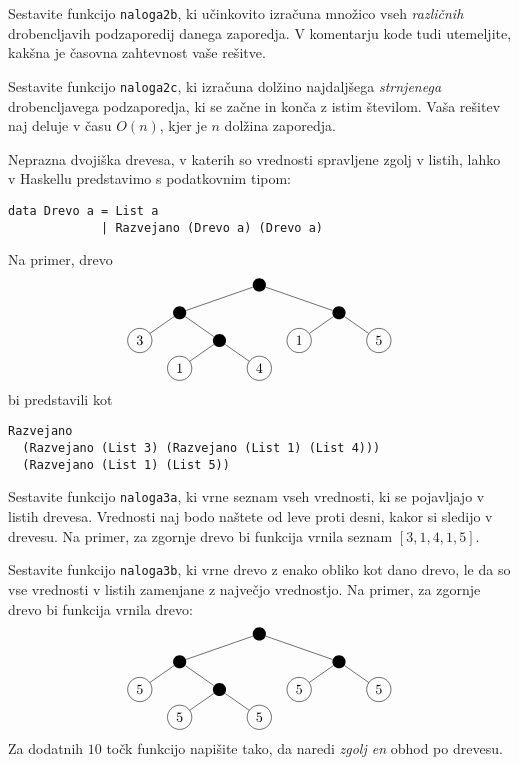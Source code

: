 \documentclass[arhiv]{../izpit}
\begin{document}
\podnaloga[10 točk]
  Sestavite funkcijo \texttt{naloga2b}, ki učinkovito izračuna množico vseh \emph{različnih} drobencljavih podzaporedij danega zaporedja. V komentarju kode tudi utemeljite, kakšna je časovna zahtevnost vaše rešitve.

\podnaloga[+10 točk]
  Sestavite funkcijo \texttt{naloga2c}, ki izračuna dolžino najdaljšega \emph{strnjenega} drobencljavega podzaporedja, ki se začne in konča z istim številom. Vaša rešitev naj deluje v času $O(n)$, kjer je $n$ dolžina zaporedja.



Neprazna dvojiška drevesa, v katerih so vrednosti spravljene zgolj v listih, lahko v Haskellu predstavimo s podatkovnim tipom:
\begin{verbatim}
data Drevo a = List a
             | Razvejano (Drevo a) (Drevo a)
\end{verbatim}
Na primer, drevo
\[
  \begin{tikzpicture}[level distance=0.7cm,
    level 1/.style={sibling distance=4cm},
    level 2/.style={sibling distance=2cm},
    level 3/.style={sibling distance=2cm}
    ]
    \node[circle, fill] (d) {}
      child {node[circle, fill] {}
        child {node[circle, draw] {3}}
        child {node[circle, fill] {}
          child {node[circle, draw] {1}}
          child {node[circle, draw] {4}}
        }
      }
      child {node[circle, fill] {}
        child {node[circle, draw] {1}}
        child {node[circle, draw] {5}}
      };
  \end{tikzpicture}
\]
bi predstavili kot
\begin{verbatim}
Razvejano
  (Razvejano (List 3) (Razvejano (List 1) (List 4)))
  (Razvejano (List 1) (List 5))
\end{verbatim}

\podnaloga[10 točk]
  Sestavite funkcijo \verb|naloga3a|, ki vrne seznam vseh vrednosti, ki se pojavljajo v listih drevesa. Vrednosti naj bodo naštete od leve proti desni, kakor si sledijo v drevesu.
  Na primer, za zgornje drevo bi funkcija vrnila seznam $[3,1,4,1,5]$.

\podnaloga[10 + 10 točk]
  Sestavite funkcijo \verb|naloga3b|, ki vrne drevo z enako obliko kot dano drevo, le da so vse vrednosti v listih zamenjane z največjo vrednostjo. Na primer, za zgornje drevo bi funkcija vrnila drevo:
  \[
    \begin{tikzpicture}[level distance=0.7cm,
      level 1/.style={sibling distance=4cm},
      level 2/.style={sibling distance=2cm},
      level 3/.style={sibling distance=2cm}
      ]
      \node[circle, fill] (d) {}
        child {node[circle, fill] {}
          child {node[circle, draw] {5}}
          child {node[circle, fill] {}
            child {node[circle, draw] {5}}
            child {node[circle, draw] {5}}
          }
        }
        child {node[circle, fill] {}
          child {node[circle, draw] {5}}
          child {node[circle, draw] {5}}
        };
    \end{tikzpicture}
  \]
  Za dodatnih $10$ točk funkcijo napišite tako, da naredi \emph{zgolj en} obhod po drevesu.
\end{document}
